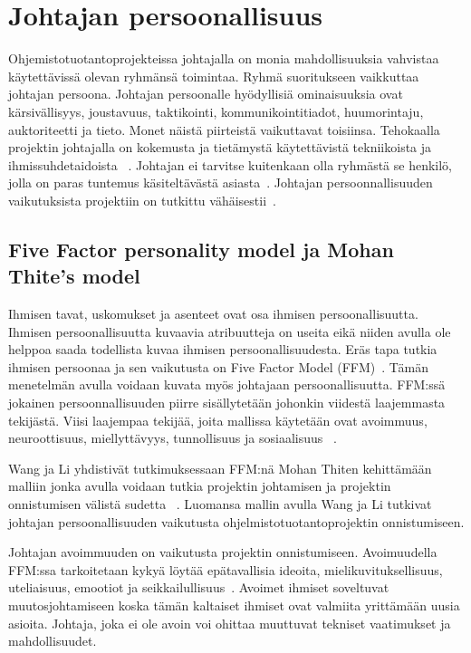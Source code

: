 \documentclass[finnish]{tktltiki2}
\theoremstyle{definition}
\theoremstyle{remark}
\begin{document}
\section{Johtajan persoonallisuus}

Ohjemistotuotantoprojekteissa johtajalla on monia mahdollisuuksia vahvistaa käytettävissä olevan ryhmänsä toimintaa. Ryhmä suoritukseen vaikkuttaa johtajan persoona. Johtajan persoonalle hyödyllisiä ominaisuuksia ovat kärsivällisyys, joustavuus, taktikointi, kommunikointitiadot, huumorintaju, auktoriteetti ja tieto. Monet näistä piirteistä vaikuttavat toisiinsa. Tehokaalla projektin johtajalla on kokemusta ja tietämystä käytettävistä tekniikoista ja ihmissuhdetaidoista ~\cite{McLeod:2011:FAS:1978802.1978803}. Johtajan ei tarvitse kuitenkaan olla ryhmästä se henkilö, jolla on paras tuntemus käsiteltävästä asiasta~\cite{4017705}. Johtajan persoonnallisuuden vaikutuksista projektiin on tutkittu vähäisestii~\cite{Wang:2009:PMP:1639950.1640049}. 

\subsection{Five Factor personality model ja Mohan Thite's model }

Ihmisen tavat, uskomukset ja asenteet ovat osa ihmisen persoonallisuutta. Ihmisen persoonallisuutta kuvaavia atribuutteja on useita eikä niiden avulla ole helppoa saada todellista kuvaa ihmisen persoonallisuudesta. Eräs tapa tutkia ihmisen persoonaa ja sen vaikutusta on Five Factor Model (FFM)~\cite{barrick2006big}. Tämän menetelmän avulla voidaan kuvata myös johtajaan persoonallisuutta. FFM:ssä jokainen persoonnallisuuden piirre sisällytetään johonkin viidestä laajemmasta tekijästä. Viisi laajempaa tekijää, joita mallissa käytetään ovat avoimmuus, neuroottisuus, miellyttävyys, tunnollisuus ja sosiaalisuus ~\cite{barrick2006big}.

Wang ja Li yhdistivät tutkimuksessaan FFM:nä Mohan Thiten kehittämään malliin jonka avulla voidaan tutkia projektin johtamisen ja projektin onnistumisen välistä sudetta ~\cite{Wang:2009:PMP:1639950.1640049}. Luomansa mallin avulla Wang ja Li tutkivat johtajan persoonallisuuden vaikutusta ohjelmistotuotantoprojektin onnistumiseen. 

Johtajan avoimmuuden on vaikutusta projektin onnistumiseen. Avoimuudella FFM:ssa tarkoitetaan kykyä löytää epätavallisia ideoita, mielikuvituksellisuus, uteliaisuus, emootiot ja seikkailullisuus~\cite{Wang:2009:PMP:1639950.1640049}. Avoimet ihmiset soveltuvat muutosjohtamiseen koska tämän kaltaiset ihmiset ovat valmiita yrittämään uusia asioita. Johtaja, joka ei ole avoin voi ohittaa muuttuvat tekniset vaatimukset ja mahdollisuudet. 
\end{document}
